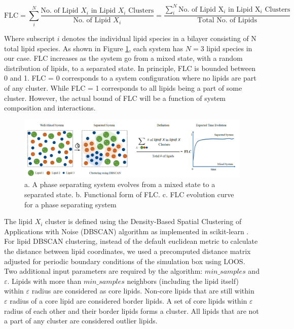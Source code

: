 \documentclass{biophys-new}
\begin{document}
\begin{equation}
\label{eq:CLT}
\text{FLC} = \sum_{i}^{N} \frac{\text{No. of Lipid $X_i$ in Lipid $X_i$ Clusters}}{\text{No. of Lipid $X_i$}} =  \frac{\sum_{i}^{N} \text{No. of Lipid X$_i$ in Lipid X$_i$ Clusters}}{\text{Total No. of Lipids}}
\end{equation}


Where subscript $i$ denotes the individual lipid species in a bilayer consisting of N total lipid species.
As shown in Figure \ref{fig1:view}, each system has $N=3$ lipid species in our case.
FLC increases as the system go from a mixed state, with a random distribution of lipids, to a separated state.
In principle, FLC is bounded between 0 and 1. FLC = 0 corresponds to a system configuration where no lipids are part of any cluster.
While FLC = 1 corresponds to all lipids being a part of some cluster. 
However, the actual bound of FLC will be a function of system composition and interactions.

\begin{figure}[hbt!]
\centering
\includegraphics[width=1\linewidth]{Figures/Figure1.PNG}
\caption{a. A phase separating system evolves from a mixed state to a separated state. b. Functional form of FLC. c. FLC evolution curve for a phase separating system}
\label{fig1:view}

\end{figure}


The lipid $X_i$ cluster is defined using the Density-Based Spatial Clustering of Applications with Noise (DBSCAN) algorithm \cite{MartinEsterHans-PeterKriegelJiirgSander1996,Ester2017} as implemented in scikit-learn \cite{PedregosaF.VaroquauxG.GramfortA.MichelV.ThirionB.GriselO.BlondelM.PrettenhoferP.WeissR.andDubourgV.VanderplasJ.PassosA.CournapeauD.BrucherM.PerrotM.Duchesnay2011}.
For lipid DBSCAN clustering, instead of the default euclidean metric to calculate the distance between lipid coordinates, we used a precomputed distance matrix adjusted for periodic boundary conditions of the simulation box using LOOS.
Two additional input parameters are required by the algorithm: $min\_samples$ and $\varepsilon$.
Lipids with more than $min\_samples$ neighbors (including the lipid itself) within $\varepsilon$ radius are considered as core lipids.
Non-core lipids that are still within $\varepsilon$ radius of a core lipid are considered border lipids.
A set of core lipids within $\varepsilon$ radius of each other and their border lipids forms a cluster.
All lipids that are not a part of any cluster are considered outlier lipids.
\end{document}
